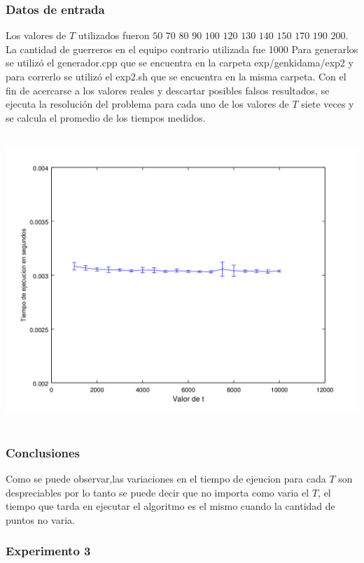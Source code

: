 		\subsubsection*{Datos de entrada}

		
			Los valores de $T$ utilizados fueron $50$ $70$ $80$ $90$ $100$ $120$ $130$ $140$ $150$ $170$ $190$ $200$.\;
			La cantidad de guerreros en el equipo contrario utilizada fue 1000
			Para generarlos se utilizó el generador.cpp que se encuentra en la carpeta exp/genkidama/exp2 y para correrlo se utilizó el exp2.sh que se encuentra en la misma carpeta.\;
			Con el fin de acercarse a los valores reales y descartar posibles falsos resultados, se ejecuta la resolución del problema para cada uno de los valores de $T$ siete veces y se calcula el promedio de los tiempos medidos.\;
      	

      	\includegraphics[height=11cm]{graficos/genkidama-exp2.png}

    	
    	\subsubsection*{Conclusiones}


			Como se puede observar,las variaciones en el tiempo de ejeucion para cada $T$ son despreciables por lo tanto se puede decir que no importa como varia el $T$, el tiempo que tarda en ejecutar el algoritmo es el mismo cuando la cantidad de puntos no varia.\;

		\;

    	\subsubsection*{Experimento 3}

